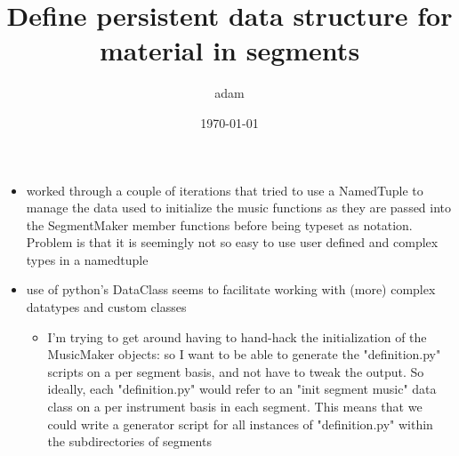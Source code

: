 \documentclass[11pt]{article}
\author{adam}
\date{\today}
\title{Define persistent data structure for material in segments}
\begin{document}
\maketitle
\begin{itemize}
\item worked through a couple of iterations that tried to use a NamedTuple to manage the data used to initialize the music functions as they are passed into the SegmentMaker member functions before being typeset as notation. Problem is that it is seemingly not so easy to use user defined and complex types in a namedtuple

\item use of python's DataClass seems to facilitate working with (more) complex datatypes and custom classes

\begin{itemize}
\item I'm trying to get around having to hand-hack the initialization of the MusicMaker objects: so I want to be able to generate the "definition.py" scripts on a per segment basis, and not have to tweak the output. So ideally, each "definition.py" would refer to an "init segment music" data class on a per instrument basis in each segment. This means that we could write a generator script for all instances of "definition.py" within the subdirectories of segments
\end{itemize}
\end{itemize}
\end{document}
